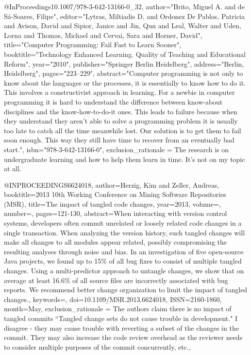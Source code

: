 @InProceedings{10.1007/978-3-642-13166-0_32,
    author="Brito, Miguel A.
    and de S{\'a}-Soares, Filipe",
    editor="Lytras, Miltiadis D.
    and Ordonez De Pablos, Patricia
    and Avison, David
    and Sipior, Janice
    and Jin, Qun
    and Leal, Walter
    and Uden, Lorna
    and Thomas, Michael
    and Cervai, Sara
    and Horner, David",
    title="Computer Programming: Fail Fast to Learn Sooner",
    booktitle="Technology Enhanced Learning. Quality of Teaching and Educational Reform",
    year="2010",
    publisher="Springer Berlin Heidelberg",
    address="Berlin, Heidelberg",
    pages="223--229",
    abstract="Computer programming is not only to know about the languages or the processes, it is essentially to know how to do it. This involves a constructivist approach in learning. For a newbie in computer programming it is hard to understand the difference between know-about disciplines and the know-how-to-do-it ones. This leads to failure because when they understand they aren't able to solve a programming problem it is usually too late to catch all the time meanwhile lost. Our solution is to get them to fail soon enough. This way they still have time to recover from an eventually bad start.",
    isbn="978-3-642-13166-0",
    exclusion_rationale = {The research is on undergraduate learning and how to help them learn in time. It's not on my topic at all.}
}

@INPROCEEDINGS{6624018,  
  author={Herzig, Kim and Zeller, Andreas},  
  booktitle={2013 10th Working Conference on Mining Software Repositories (MSR)},  
  title={The impact of tangled code changes}, 
  year={2013},
  volume={},
  number={}, 
  pages={121-130},
  abstract={When interacting with version control systems, developers often commit unrelated or loosely related code changes in a single transaction. When analyzing the version history, such tangled changes will make all changes to all modules appear related, possibly compromising the resulting analyses through noise and bias. In an investigation of five open-source Java projects, we found up to 15\% of all bug fixes to consist of multiple tangled changes. Using a multi-predictor approach to untangle changes, we show that on average at least 16.6\% of all source files are incorrectly associated with bug reports. We recommend better change organization to limit the impact of tangled changes.},  
  keywords={}, 
  doi={10.1109/MSR.2013.6624018}, 
  ISSN={2160-1860},
  month={May},
  exclusion_rationale = {The authors claim there is no impact of tangled commits ``Tangled change sets do not cause trouble in development." I disagree - they may cause trouble with reverting a subset of the changes in the commit. They may also increase the code review overhead as the reviewer needs to consider multiple purposes of the commit concurrently, etc.},
}

